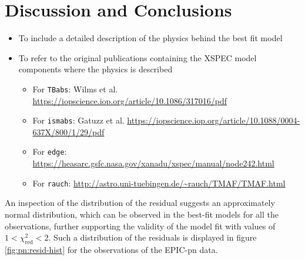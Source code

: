 \section{Discussion and Conclusions}
	\begin{itemize}
		\item To include a detailed description of the physics behind the best fit model
		\item To refer to the original publications containing the XSPEC model components where the physics is described
		\begin{itemize}
			\item For \texttt{TBabs}: Wilms et al. \url{https://iopscience.iop.org/article/10.1086/317016/pdf}
			\item For \texttt{ismabs}: Gatuzz et al. \url{https://iopscience.iop.org/article/10.1088/0004-637X/800/1/29/pdf}
			\item For \texttt{edge}: \url{https://heasarc.gsfc.nasa.gov/xanadu/xspec/manual/node242.html}
			\item For \texttt{rauch}: \url{http://astro.uni-tuebingen.de/~rauch/TMAF/TMAF.html}
		\end{itemize}
	\end{itemize}
	An inspection of the distribution of the residual suggests an approximately normal distribution, which can be observed in the best-fit models for all the observations, further supporting the validity of the model fit with values of $1<\chi^2_\text{red}<2$. Such a distribution of the residuals is displayed in figure \ref{fig:pn:resid-hist} for the observations of the EPIC-pn data.
	
